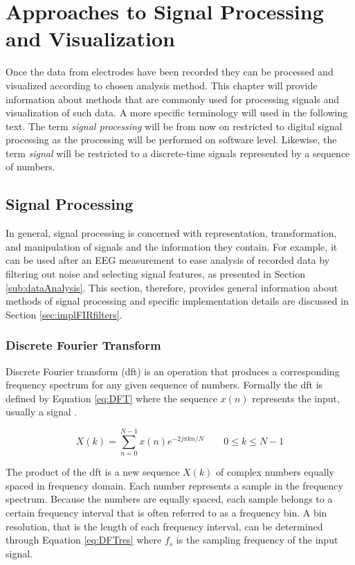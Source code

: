 \chapter{Approaches to Signal Processing and Visualization} \label{appProcVis}
Once the data from electrodes have been recorded they can be processed and visualized according to chosen analysis method. This chapter will provide information about methods that are commonly used for processing signals and visualization of such data. A more specific terminology will used in the following text. The term \emph{signal processing} will be from now on restricted to digital signal processing as the processing will be performed on software level. Likewise, the term \emph{signal} will be restricted to a discrete-time signals represented by a sequence of numbers. 

\section{Signal Processing} \label{sec:sigProc}
In general, signal processing is concerned with representation, transformation, and manipulation of signals and the information they contain. For example, it can be used after an EEG measurement to ease analysis of recorded data by filtering out noise and selecting signal features, as presented in Section \ref{sub:dataAnalysis}. This section, therefore, provides general information about
methods of signal processing and specific implementation details are discussed in Section \ref{sec:implFIRfilters}. 

\subsection{Discrete Fourier Transform}
Discrete Fourier transform (\gls{dft}) is an operation that produces a corresponding frequency spectrum for any given sequence of numbers. Formally the \gls{dft} is defined by Equation \ref{eq:DFT} where the sequence $x(n)$ represents the input, usually a signal \cite[p. 401]{DSP3}. 

\begin{equation}
\label{eq:DFT}
	X(k) = \sum\limits_{n=0}^{N - 1}x(n)e^{-2 j \pi k n /N} \qquad 0 \leq k \leq N-1
\end{equation}

The product of the \gls{dft} is a new sequence $X(k)$ of complex numbers equally spaced in frequency domain. Each number represents a sample in the frequency spectrum. Because the numbers are equally spaced, each sample belongs to a certain frequency interval that is often referred to as a frequency bin. A bin resolution, that is the length of each frequency interval, can be determined through Equation \ref{eq:DFTres} where $f_s$ is the sampling frequency of the input signal. 

